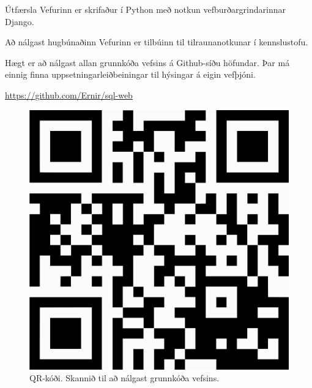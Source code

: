 \documentclass[final]{beamer}
\begin{document}
\begin{frame}
\begin{tcolorbox}[standard jigsaw, height=97cm, colframe=orange, opacityback=0, sharp corners=all]
\begin{columns}[t]
\begin{column}{.47\linewidth}

\begin{block}{Útfærsla}
    Vefurinn er skrifaður í Python með notkun vefburðargrindarinnar Django. 


        

\end{block}

\begin{block}{Að nálgast hugbúnaðinn}
    Vefurinn er tilbúinn til tilraunanotkunar í kennslustofu.

    Hægt er að nálgast allan grunnkóða vefsins á Github-síðu höfundar. Þar má einnig finna uppsetningarleiðbeiningar til hýsingar á eigin vefþjóni.

    \url{https://github.com/Ernir/sql-web}
    
    \begin{center}
        \begin{figure}
            \caption{QR-kóði. Skannið til að nálgast grunnkóða vefsins.}
            \includegraphics[width=0.25\linewidth]{qr-code}
        \end{figure}
    \end{center}
\end{block}

\end{column}

\end{columns}
\end{tcolorbox}
\end{frame}
\end{document}
